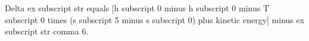 Delta ex subscript str equals [h subscript 0 minus h subscript 0 minus T subscript 0 times (s subscript 5 minus s subscript 0) plus kinetic energy] minus ex subscript str comma 6.